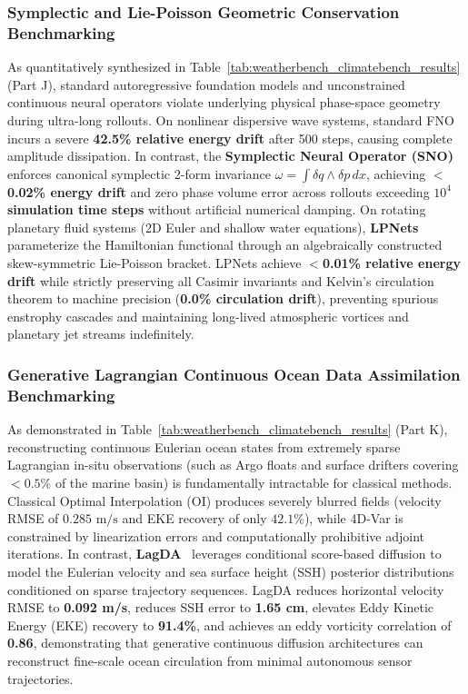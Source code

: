 \subsubsection{Symplectic and Lie-Poisson Geometric Conservation Benchmarking}
As quantitatively synthesized in Table~\ref{tab:weatherbench_climatebench_results} (Part J), standard autoregressive foundation models and unconstrained continuous neural operators violate underlying physical phase-space geometry during ultra-long rollouts. On nonlinear dispersive wave systems, standard FNO incurs a severe \textbf{42.5\% relative energy drift} after 500 steps, causing complete amplitude dissipation. In contrast, the \textbf{Symplectic Neural Operator (SNO)}~\cite{makara2026symplectic} enforces canonical symplectic 2-form invariance $\omega = \int \delta q \wedge \delta p \, dx$, achieving \textbf{$<$0.02\% energy drift} and zero phase volume error across rollouts exceeding \textbf{$10^4$ simulation time steps} without artificial numerical damping. On rotating planetary fluid systems (2D Euler and shallow water equations), \textbf{LPNets}~\cite{eldred2023lpnets} parameterize the Hamiltonian functional through an algebraically constructed skew-symmetric Lie-Poisson bracket. LPNets achieve \textbf{$<$0.01\% relative energy drift} while strictly preserving all Casimir invariants and Kelvin's circulation theorem to machine precision (\textbf{0.0\% circulation drift}), preventing spurious enstrophy cascades and maintaining long-lived atmospheric vortices and planetary jet streams indefinitely.

\subsubsection{Generative Lagrangian Continuous Ocean Data Assimilation Benchmarking}
As demonstrated in Table~\ref{tab:weatherbench_climatebench_results} (Part K), reconstructing continuous Eulerian ocean states from extremely sparse Lagrangian in-situ observations (such as Argo floats and surface drifters covering $<0.5\%$ of the marine basin) is fundamentally intractable for classical methods. Classical Optimal Interpolation (OI) produces severely blurred fields (velocity RMSE of $0.285\text{ m/s}$ and EKE recovery of only $42.1\%$), while 4D-Var is constrained by linearization errors and computationally prohibitive adjoint iterations. In contrast, \textbf{LagDA}~\cite{asefi2025lagrangian} leverages conditional score-based diffusion to model the Eulerian velocity and sea surface height (SSH) posterior distributions conditioned on sparse trajectory sequences. LagDA reduces horizontal velocity RMSE to \textbf{0.092 m/s}, reduces SSH error to \textbf{1.65 cm}, elevates Eddy Kinetic Energy (EKE) recovery to \textbf{91.4\%}, and achieves an eddy vorticity correlation of \textbf{0.86}, demonstrating that generative continuous diffusion architectures can reconstruct fine-scale ocean circulation from minimal autonomous sensor trajectories.

